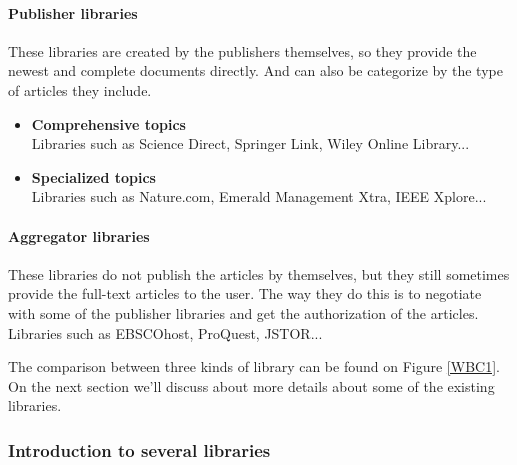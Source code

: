 \paragraph{Publisher libraries}

	These libraries are created by the publishers themselves, so they provide the newest and complete documents directly.
	And can also be categorize by the type of articles they include.
	
	\begin{itemize}
		
		\item\textbf{Comprehensive topics}\\Libraries such as Science Direct, Springer Link, Wiley Online Library...
		\item\textbf{Specialized topics}\\Libraries such as Nature.com, Emerald Management Xtra, IEEE Xplore...
		
	\end{itemize}
	
\paragraph{Aggregator libraries}

	These libraries do not publish the articles by themselves, but they still sometimes provide the full-text articles to the user.
	The way they do this is to negotiate with some of the publisher libraries and get the authorization of the articles.
	Libraries such as EBSCOhost, ProQuest, JSTOR...

The comparison between three kinds of library can be found on Figure \ref{WBC1}. 
On the next section we'll discuss about more details about some of the existing libraries.

\subsubsection{Introduction to several libraries }

